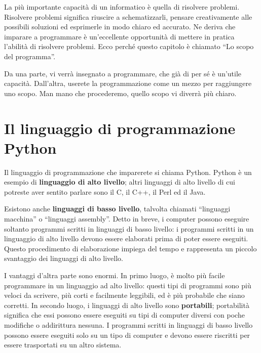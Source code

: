 \documentclass[10pt]{book}
\begin{document}
La più importante capacità di un informatico è quella di risolvere problemi. Risolvere problemi significa riuscire a schematizzarli, pensare creativamente alle possibili soluzioni ed esprimerle in modo chiaro ed accurato. Ne deriva che imparare a programmare è un'eccellente opportunità di mettere in pratica l'abilità di risolvere problemi. Ecco perché questo capitolo è chiamato ``Lo scopo del programma''.

Da una parte, vi verrà insegnato a programmare, che già di per sé è un'utile   capacità. Dall'altra, userete la programmazione come un mezzo per raggiungere   uno scopo. Man mano che procederemo, quello scopo vi diverrà più chiaro.

\section{Il linguaggio di programmazione Python}

Il linguaggio di programmazione che imparerete si chiama Python. Python è un   esempio di {\bf linguaggio di alto livello}; altri linguaggi di alto livello   di cui potreste aver sentito parlare sono il C, il C++, il Perl ed il Java.

Esistono anche {\bf linguaggi di basso livello}, talvolta chiamati ``linguaggi macchina'' o ``linguaggi assembly''. Detto in breve, i computer possono eseguire soltanto programmi scritti in linguaggi di basso livello: i programmi scritti in un linguaggio di alto livello devono essere elaborati prima di poter essere eseguiti. Questo procedimento di elaborazione impiega del tempo e rappresenta un piccolo svantaggio dei linguaggi di alto livello.

I vantaggi d'altra parte sono enormi. In primo luogo, è molto più facile programmare in un linguaggio ad alto livello: questi tipi di programmi sono più veloci da scrivere, più corti e facilmente leggibili, ed è più probabile che siano corretti. In secondo luogo, i linguaggi di alto livello sono {\bf portabili}; portabilità significa che essi possono essere eseguiti su tipi di computer diversi con poche modifiche o addirittura nessuna. I programmi scritti in linguaggi di basso livello possono essere eseguiti solo su un tipo di computer e devono essere riscritti per essere trasportati su un altro sistema.
\end{document}
